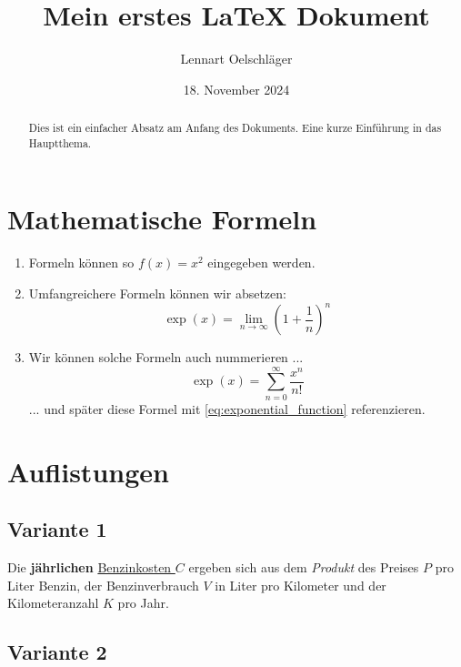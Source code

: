 \documentclass{article}
\title{Mein erstes LaTeX Dokument}
\author{Lennart Oelschläger}
\date{18. November 2024}
\begin{document}
\maketitle

\begin{abstract}
    Dies ist ein einfacher Absatz am Anfang des Dokuments. Eine kurze Einführung in das Hauptthema.
\end{abstract}

\tableofcontents

\newpage

\section{Mathematische Formeln}

\begin{enumerate}
    \item Formeln können so $f(x) = x^2$ eingegeben werden. 
    \item Umfangreichere Formeln können wir absetzen:
    $$ \exp(x) =  \lim_{n \to \infty} \left( 1 + \frac{1}{n} \right)^n $$
    \item Wir können solche Formeln auch nummerieren ...
    \begin{equation}
        \label{eq:exponential_function}
        \exp(x) = \sum_{n = 0}^\infty \frac{x^n}{n!}
    \end{equation}
    ... und später diese Formel mit \eqref{eq:exponential_function} referenzieren.
\end{enumerate}

\section{Auflistungen}

\subsection{Variante 1}

Die \textbf{jährlichen} \underline{Benzinkosten $C$} ergeben sich aus dem \textit{Produkt} des Preises $P$ pro Liter Benzin, der Benzinverbrauch $V$ in Liter pro Kilometer und der Kilometeranzahl $K$ pro Jahr.

\subsection{Variante 2}
\end{document}
